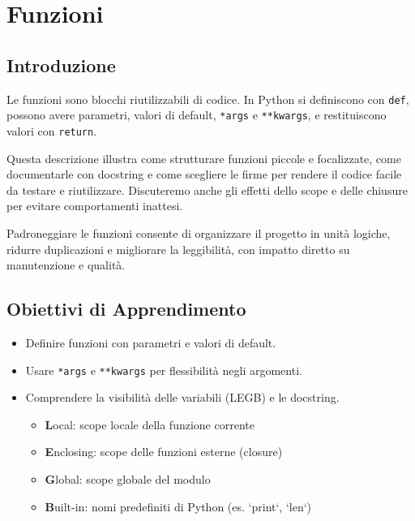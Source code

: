 \chapter{Funzioni}
\label{chap:funzioni}

\section{Introduzione}
\label{sec:fun-introduzione}
Le funzioni sono blocchi riutilizzabili di codice. In Python si definiscono con \texttt{def}, possono avere parametri, valori di default, \texttt{*args} e \texttt{**kwargs}, e restituiscono valori con \texttt{return}.

Questa descrizione illustra come strutturare funzioni piccole e focalizzate, come documentarle con docstring e come scegliere le firme per rendere il codice facile da testare e riutilizzare. Discuteremo anche gli effetti dello scope e delle chiusure per evitare comportamenti inattesi.

Padroneggiare le funzioni consente di organizzare il progetto in unità logiche, ridurre duplicazioni e migliorare la leggibilità, con impatto diretto su manutenzione e qualità.

\section{Obiettivi di Apprendimento}
\label{sec:fun-obiettivi}
\begin{itemize}
  \item Definire funzioni con parametri e valori di default.
  \item Usare \texttt{*args} e \texttt{**kwargs} per flessibilità negli argomenti.
  \item Comprendere la visibilità delle variabili (LEGB) e le docstring.
  \begin{itemize}
    \item \textbf{L}ocal: scope locale della funzione corrente
    \item \textbf{E}nclosing: scope delle funzioni esterne (closure)
    \item \textbf{G}lobal: scope globale del modulo
    \item \textbf{B}uilt-in: nomi predefiniti di Python (es. `print`, `len`)
  \end{itemize}
\end{itemize}

